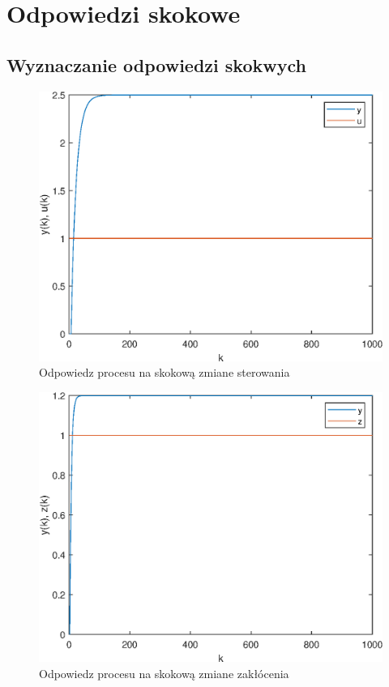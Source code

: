 \chapter{Odpowiedzi skokowe}
\label{zad2}

\section{Wyznaczanie odpowiedzi skokwych}
\label{zad2_skoki}

\begin{figure}[t]
\centering
    \includegraphics[scale=1]{Rys/odp_skok_u.eps}
    \caption{Odpowiedz procesu na skokową zmiane sterowania}
    \label{zad2_odp_skok_u}
\end{figure}

\begin{figure}[t]
	\centering
	\includegraphics[scale=1]{Rys/odp_skok_z.eps}
	\caption{Odpowiedz procesu na skokową zmiane zakłócenia}
	\label{zad2_odp_skok_z}
\end{figure}

